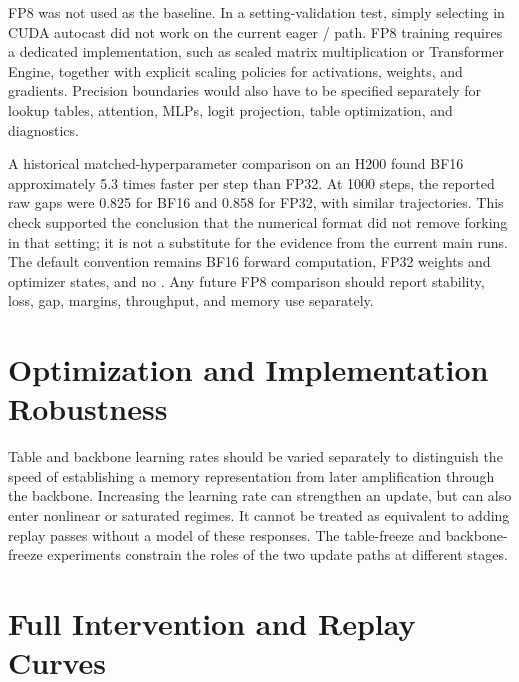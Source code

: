 FP8 was not used as the baseline. In a setting-validation test, simply selecting  in CUDA autocast did not work on the current eager / path. FP8 training requires a dedicated implementation, such as scaled matrix multiplication or Transformer Engine, together with explicit scaling policies for activations, weights, and gradients. Precision boundaries would also have to be specified separately for lookup tables, attention, MLPs, logit projection, table optimization, and diagnostics.

A historical matched-hyperparameter comparison on an H200 found BF16 approximately 5.3 times faster per step than FP32. At 1000 steps, the reported raw gaps were 0.825 for BF16 and 0.858 for FP32, with similar trajectories. This check supported the conclusion that the numerical format did not remove forking in that setting; it is not a substitute for the evidence from the current main runs. The default convention remains BF16 forward computation, FP32 weights and optimizer states, and no . Any future FP8 comparison should report stability, loss, gap, margins, throughput, and memory use separately.

\section{Optimization and Implementation Robustness}
\label{app:optimization}

Table and backbone learning rates should be varied separately to distinguish the speed of establishing a memory representation from later amplification through the backbone. Increasing the learning rate can strengthen an update, but can also enter nonlinear or saturated regimes. It cannot be treated as equivalent to adding replay passes without a model of these responses. The table-freeze and backbone-freeze experiments constrain the roles of the two update paths at different stages.


\section{Full Intervention and Replay Curves}
\label{app:interventions}

